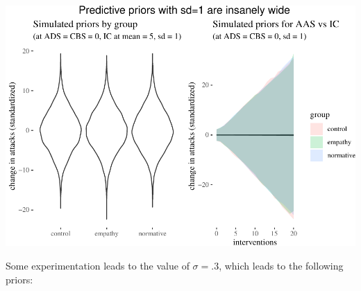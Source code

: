 \documentclass[10pt,dvipsnames,enabledeprecatedfontcommands]{scrartcl}
\begin{document}
\begin{center}\includegraphics[width=1\linewidth]{bayesianReport_files/figure-latex/unnamed-chunk-6-1} \end{center}

\normalsize

Some experimentation leads to the value of \(\sigma =.3\), which leads
to the following priors:

\vspace{1mm} \footnotesize
\end{document}
